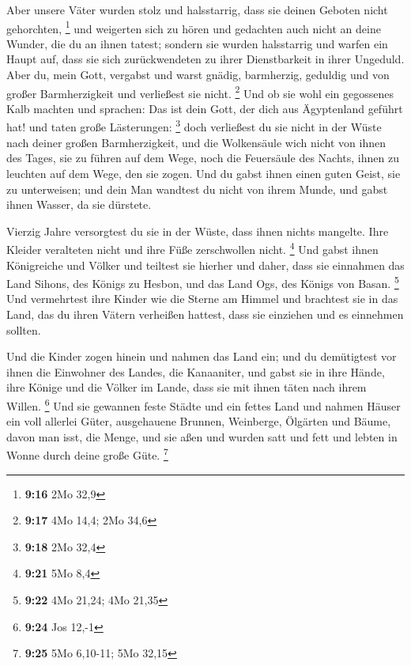  Aber unsere Väter wurden stolz und halsstarrig, dass sie
deinen Geboten nicht gehorchten, \footnote{\textbf{9:16} 2Mo 32,9}
 und weigerten sich zu hören und gedachten auch nicht an
deine Wunder, die du an ihnen tatest; sondern sie wurden halsstarrig und
warfen ein Haupt auf, dass sie sich zurückwendeten zu ihrer
Dienstbarkeit in ihrer Ungeduld. Aber du, mein Gott, vergabst und warst
gnädig, barmherzig, geduldig und von großer Barmherzigkeit und
verließest sie nicht. \footnote{\textbf{9:17} 4Mo 14,4; 2Mo 34,6}
 Und ob sie wohl ein gegossenes Kalb machten und
sprachen: Das ist dein Gott, der dich aus Ägyptenland geführt hat! und
taten große Lästerungen: \footnote{\textbf{9:18} 2Mo 32,4}
 doch verließest du sie nicht in der Wüste nach deiner
großen Barmherzigkeit, und die Wolkensäule wich nicht von ihnen des
Tages, sie zu führen auf dem Wege, noch die Feuersäule des Nachts, ihnen
zu leuchten auf dem Wege, den sie zogen.  Und du gabst
ihnen einen guten Geist, sie zu unterweisen; und dein Man wandtest du
nicht von ihrem Munde, und gabst ihnen Wasser, da sie dürstete.

 Vierzig Jahre versorgtest du sie in der Wüste, dass
ihnen nichts mangelte. Ihre Kleider veralteten nicht und ihre Füße
zerschwollen nicht. \footnote{\textbf{9:21} 5Mo 8,4}  Und
gabst ihnen Königreiche und Völker und teiltest sie hierher und daher,
dass sie einnahmen das Land Sihons, des Königs zu Hesbon, und das Land
Ogs, des Königs von Basan. \footnote{\textbf{9:22} 4Mo 21,24; 4Mo 21,35}
 Und vermehrtest ihre Kinder wie die Sterne am Himmel und
brachtest sie in das Land, das du ihren Vätern verheißen hattest, dass
sie einziehen und es einnehmen sollten.

 Und die Kinder zogen hinein und nahmen das Land ein; und
du demütigtest vor ihnen die Einwohner des Landes, die Kanaaniter, und
gabst sie in ihre Hände, ihre Könige und die Völker im Lande, dass sie
mit ihnen täten nach ihrem Willen. \footnote{\textbf{9:24} Jos 12,-1}
 Und sie gewannen feste Städte und ein fettes Land und
nahmen Häuser ein voll allerlei Güter, ausgehauene Brunnen, Weinberge,
Ölgärten und Bäume, davon man isst, die Menge, und sie aßen und wurden
satt und fett und lebten in Wonne durch deine große Güte. \footnote{\textbf{9:25}
  5Mo 6,10-11; 5Mo 32,15}

